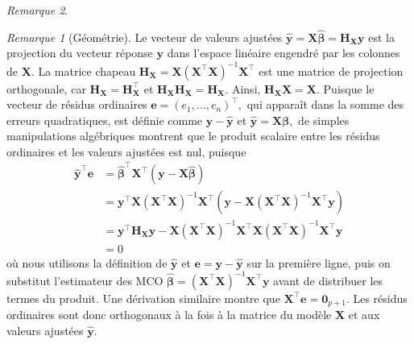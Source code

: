 \documentclass[
  11pt,
  letterpaper,
]{scrbook}
\theoremstyle{plain}
\theoremstyle{plain}
\theoremstyle{definition}
\theoremstyle{definition}
\theoremstyle{remark}
\newtheorem{refremark}{Remarque}[chapter]
\begin{document}
\begin{refremark}
\leavevmode

\begin{refremark}[Géométrie]
Le vecteur de valeurs ajustées
\(\widehat{\boldsymbol{y}} =\mathbf{X} \widehat{\boldsymbol{\beta}} = \mathbf{H}_{\mathbf{X}}\boldsymbol{y}\)
est la projection du vecteur réponse \(\boldsymbol{y}\) dans l'espace
linéaire engendré par les colonnes de \(\mathbf{X}.\) La matrice chapeau
\(\mathbf{H}_{\mathbf{X}} = \mathbf{X}(\mathbf{X}^\top\mathbf{X})^{-1}\mathbf{X}^\top\)
est une matrice de projection orthogonale, car
\(\mathbf{H}_{\mathbf{X}}=\mathbf{H}_{\mathbf{X}}^\top\) et
\(\mathbf{H}_{\mathbf{X}}\mathbf{H}_{\mathbf{X}} = \mathbf{H}_{\mathbf{X}}.\)
Ainsi, \(\mathbf{H}_{\mathbf{X}}\mathbf{X} = \mathbf{X}.\) Puisque le
vecteur de résidus ordinaires
\(\boldsymbol{e} = (e_1, \ldots, e_n)^\top,\) qui apparaît dans la somme
des erreurs quadratiques, est définie comme
\(\boldsymbol{y} - \widehat{\boldsymbol{y}}\) et
\(\widehat{\boldsymbol{y}}=\mathbf{X}\boldsymbol{\beta},\) de simples
manipulations algébriques montrent que le produit scalaire entre les
résidus ordinaires et les valeurs ajustées est nul, puisque
\begin{align*}
\widehat{\boldsymbol{y}}^\top\boldsymbol{e} &= \widehat{\boldsymbol{\beta}}^\top \mathbf{X}^\top (\boldsymbol{y}- \mathbf{X} \widehat{\boldsymbol{\beta}})
\\&= \boldsymbol{y}^\top\mathbf{X}(\mathbf{X}^\top\mathbf{X})^{-1}\mathbf{X}^\top(\boldsymbol{y} - \mathbf{X}(\mathbf{X}^\top\mathbf{X})^{-1}\mathbf{X}^\top \boldsymbol{y})\\&=\boldsymbol{y}^\top\mathbf{H}_{\mathbf{X}}\boldsymbol{y} - \mathbf{X}(\mathbf{X}^\top\mathbf{X})^{-1}\mathbf{X}^\top\mathbf{X}(\mathbf{X}^\top\mathbf{X})^{-1}\mathbf{X}^\top \boldsymbol{y}
\\&= 0
\end{align*} où nous utilisons la définition de
\(\widehat{\boldsymbol{y}}\) et
\(\boldsymbol{e} = \boldsymbol{y} - \widehat{\boldsymbol{y}}\) sur la
première ligne, puis on substitut l'estimateur des MCO
\(\widehat{\boldsymbol{\beta}} = (\mathbf{X}^\top\mathbf{X})^{-1}\mathbf{X}^\top\boldsymbol{y}\)
avant de distribuer les termes du produit. Une dérivation similaire
montre que \(\mathbf{X}^\top\boldsymbol{e}=\boldsymbol{0}_{p+1}.\) Les
résidus ordinaires sont donc orthogonaux à la fois à la matrice du
modèle \(\mathbf{X}\) et aux valeurs ajustées
\(\widehat{\boldsymbol{y}}.\)

\label{rem-geometry}


\end{refremark}
\end{refremark}
\end{document}
